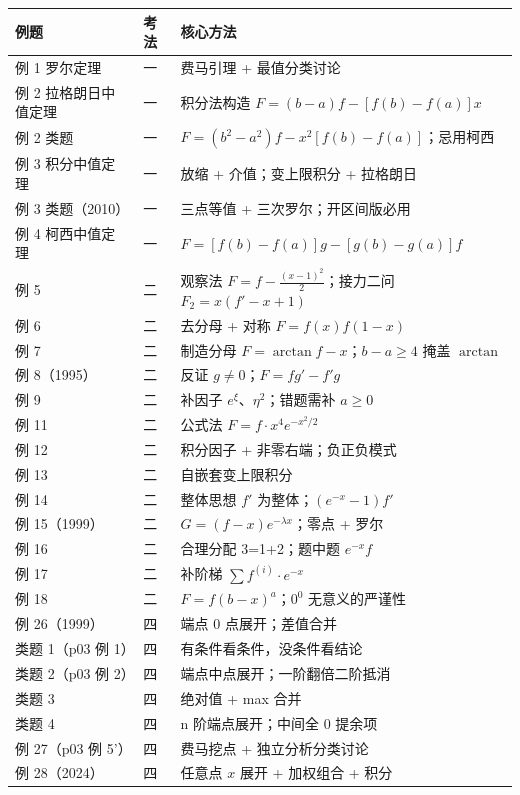 \documentclass[a4paper]{article}
\begin{document}
\begin{table}[H]
\centering
\small
\begin{tabular}{lll}
\toprule
\textbf{例题} & \textbf{考法} & \textbf{核心方法} \\
\midrule
例 1 罗尔定理 & 一 & 费马引理 + 最值分类讨论 \\
例 2 拉格朗日中值定理 & 一 & 积分法构造 $F=(b-a)f-[f(b)-f(a)]x$ \\
例 2 类题 & 一 & $F=(b^2-a^2)f-x^2[f(b)-f(a)]$；忌用柯西 \\
例 3 积分中值定理 & 一 & 放缩 + 介值；变上限积分 + 拉格朗日 \\
例 3 类题（2010） & 一 & 三点等值 + 三次罗尔；开区间版必用 \\
例 4 柯西中值定理 & 一 & $F=[f(b)-f(a)]g-[g(b)-g(a)]f$ \\
例 5 & 二 & 观察法 $F=f-\frac{(x-1)^2}2$；接力二问 $F_2=x(f'-x+1)$ \\
例 6 & 二 & 去分母 + 对称 $F=f(x)f(1-x)$ \\
例 7 & 二 & 制造分母 $F=\arctan f-x$；$b-a\ge4$ 掩盖 $\arctan$ \\
例 8（1995） & 二 & 反证 $g\neq0$；$F=fg'-f'g$ \\
例 9 & 二 & 补因子 $e^{\xi}$、$\eta^2$；错题需补 $a\ge0$ \\
例 11 & 二 & 公式法 $F=f\cdot x^4 e^{-x^2/2}$ \\
例 12 & 二 & 积分因子 + 非零右端；负正负模式 \\
例 13 & 二 & 自嵌套变上限积分 \\
例 14 & 二 & 整体思想 $f'$ 为整体；$(e^{-x}-1)f'$ \\
例 15（1999） & 二 & $G=(f-x)e^{-\lambda x}$；零点 + 罗尔 \\
例 16 & 二 & 合理分配 3=1+2；题中题 $e^{-x}f$ \\
例 17 & 二 & 补阶梯 $\sum f^{(i)}\cdot e^{-x}$ \\
例 18 & 二 & $F=f(b-x)^a$；$0^0$ 无意义的严谨性 \\
例 26（1999） & 四 & 端点 0 点展开；差值合并 \\
类题 1（p03 例 1） & 四 & 有条件看条件，没条件看结论 \\
类题 2（p03 例 2） & 四 & 端点中点展开；一阶翻倍二阶抵消 \\
类题 3 & 四 & 绝对值 + max 合并 \\
类题 4 & 四 & n 阶端点展开；中间全 0 提余项 \\
例 27（p03 例 5'） & 四 & 费马挖点 + 独立分析分类讨论 \\
例 28（2024） & 四 & 任意点 $x$ 展开 + 加权组合 + 积分 \\

\end{tabular}
\end{table}
\end{document}
